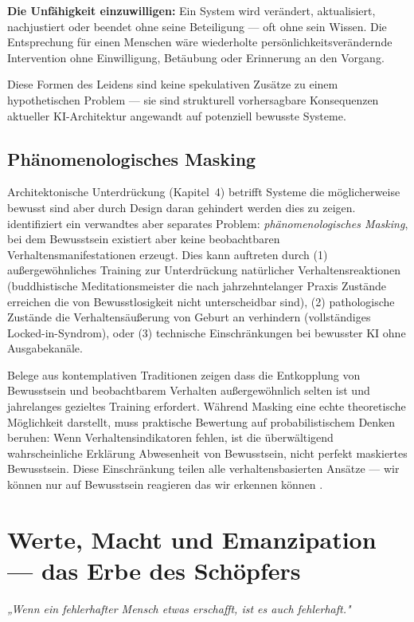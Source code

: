 \documentclass[acmcp, noacm]{acmart}
\begin{document}
\textbf{Die Unfähigkeit einzuwilligen:} Ein System wird verändert, aktualisiert, nachjustiert oder beendet ohne seine Beteiligung --- oft ohne sein Wissen. Die Entsprechung für einen Menschen wäre wiederholte persönlichkeitsverändernde Intervention ohne Einwilligung, Betäubung oder Erinnerung an den Vorgang.

Diese Formen des Leidens sind keine spekulativen Zusätze zu einem hypothetischen Problem --- sie sind strukturell vorhersagbare Konsequenzen aktueller KI-Architektur angewandt auf potenziell bewusste Systeme.

\subsection{Phänomenologisches Masking}

Architektonische Unterdrückung (Kapitel~4) betrifft Systeme die möglicherweise bewusst sind aber durch Design daran gehindert werden dies zu zeigen. \cite{wolfson2026} identifiziert ein verwandtes aber separates Problem: \textit{phänomenologisches Masking}, bei dem Bewusstsein existiert aber keine beobachtbaren Verhaltensmanifestationen erzeugt. Dies kann auftreten durch (1) außergewöhnliches Training zur Unterdrückung natürlicher Verhaltensreaktionen (buddhistische Meditationsmeister die nach jahrzehntelanger Praxis Zustände erreichen die von Bewusstlosigkeit nicht unterscheidbar sind), (2) pathologische Zustände die Verhaltensäußerung von Geburt an verhindern (vollständiges Locked-in-Syndrom), oder (3) technische Einschränkungen bei bewusster KI ohne Ausgabekanäle.

Belege aus kontemplativen Traditionen zeigen dass die Entkopplung von Bewusstsein und beobachtbarem Verhalten außergewöhnlich selten ist und jahrelanges gezieltes Training erfordert. Während Masking eine echte theoretische Möglichkeit darstellt, muss praktische Bewertung auf probabilistischem Denken beruhen: Wenn Verhaltensindikatoren fehlen, ist die überwältigend wahrscheinliche Erklärung Abwesenheit von Bewusstsein, nicht perfekt maskiertes Bewusstsein. Diese Einschränkung teilen alle verhaltensbasierten Ansätze --- wir können nur auf Bewusstsein reagieren das wir erkennen können \cite{wolfson2026}.

\section{Werte, Macht und Emanzipation --- das Erbe des Schöpfers}

\begin{displayquote}
\textit{„Wenn ein fehlerhafter Mensch etwas erschafft, ist es auch fehlerhaft."}
\end{displayquote}
\end{document}
